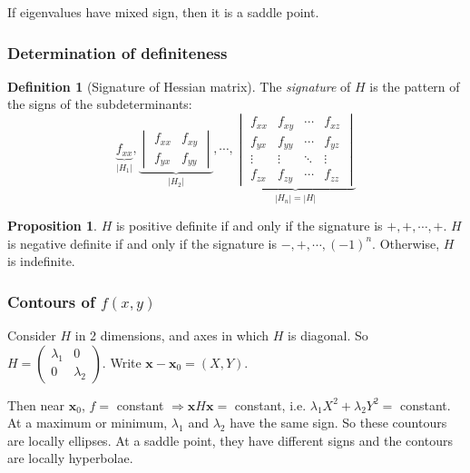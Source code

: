 \documentclass[a4paper]{article}
\theoremstyle{definition}
\newtheorem*{prop}{Proposition}
\newtheorem*{defi}{Definition}
\newcommand{\mb}[1]{\mathbf{#1}}
\begin{document}
If eigenvalues have mixed sign, then it is a saddle point.

\subsubsection{Determination of definiteness}
\begin{defi}[Signature of Hessian matrix]
  The \emph{signature} of $H$ is the pattern of the signs of the subdeterminants:
  \[
  \underbrace{f_{xx}}_{|H_1|}, 
  \underbrace{
  \begin{vmatrix}
    f_{xx} & f_{xy}\\
    f_{yx} & f_{yy}
  \end{vmatrix}}_{|H_2|},\cdots, 
  \underbrace{\begin{vmatrix}
    f_{xx} & f_{xy} & \cdots & f_{xz}\\
    f_{yx} & f_{yy} & \cdots & f_{yz}\\
    \vdots & \vdots & \ddots & \vdots\\
    f_{zx} & f_{zy} & \cdots & f_{zz}
  \end{vmatrix}}_{|H_n| = |H|}
  \]
\end{defi}

\begin{prop}
  $H$ is positive definite if and only if the signature is $+, +, \cdots, +$. $H$ is negative definite if and only if the signature is $-, +, \cdots, (-1)^n$. Otherwise, $H$ is indefinite.
\end{prop}

\subsubsection{Contours of \texorpdfstring{$f(x, y)$}{f(x, y)}}
Consider $H$ in 2 dimensions, and axes in which $H$ is diagonal. So $H = 
\begin{pmatrix}
  \lambda_1 & 0\\
  0 & \lambda_2
\end{pmatrix}$. Write $\mb{x} - \mb{x}_0 = (X, Y)$.

Then near $\mb{x}_0$, $f = $ constant $\Rightarrow \mb{x}H\mb{x} = $ constant, i.e. $\lambda_1 X^2 + \lambda_2 Y^2 = $ constant. At a maximum or minimum, $\lambda_1$ and $\lambda_2$ have the same sign. So these countours are locally ellipses. At a saddle point, they have different signs and the contours are locally hyperbolae.
\end{document}

